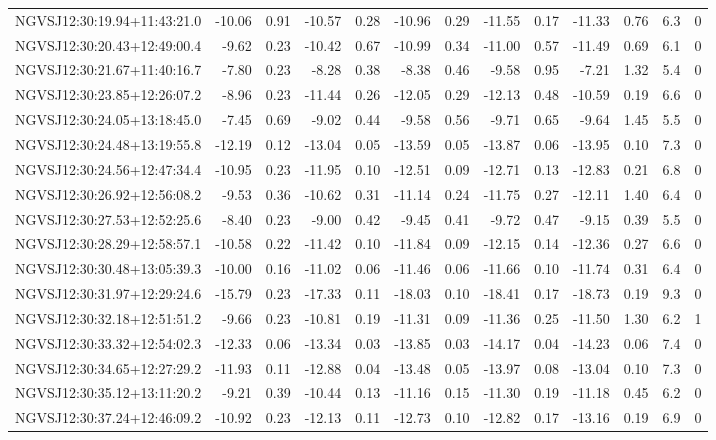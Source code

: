 \begin{tabular}{lrrrrrrrrrrcc}
NGVSJ12:30:19.94+11:43:21.0 & -10.06 & 0.91 & -10.57 & 0.28 & -10.96 & 0.29 & -11.55 & 0.17 & -11.33 & 0.76 & 6.3 & 0 \\
NGVSJ12:30:20.43+12:49:00.4 & -9.62 & 0.23 & -10.42 & 0.67 & -10.99 & 0.34 & -11.00 & 0.57 & -11.49 & 0.69 & 6.1 & 0 \\
NGVSJ12:30:21.67+11:40:16.7 & -7.80 & 0.23 & -8.28 & 0.38 & -8.38 & 0.46 & -9.58 & 0.95 & -7.21 & 1.32 & 5.4 & 0 \\
NGVSJ12:30:23.85+12:26:07.2 & -8.96 & 0.23 & -11.44 & 0.26 & -12.05 & 0.29 & -12.13 & 0.48 & -10.59 & 0.19 & 6.6 & 0 \\
NGVSJ12:30:24.05+13:18:45.0 & -7.45 & 0.69 & -9.02 & 0.44 & -9.58 & 0.56 & -9.71 & 0.65 & -9.64 & 1.45 & 5.5 & 0 \\
NGVSJ12:30:24.48+13:19:55.8 & -12.19 & 0.12 & -13.04 & 0.05 & -13.59 & 0.05 & -13.87 & 0.06 & -13.95 & 0.10 & 7.3 & 0 \\
NGVSJ12:30:24.56+12:47:34.4 & -10.95 & 0.23 & -11.95 & 0.10 & -12.51 & 0.09 & -12.71 & 0.13 & -12.83 & 0.21 & 6.8 & 0 \\
NGVSJ12:30:26.92+12:56:08.2 & -9.53 & 0.36 & -10.62 & 0.31 & -11.14 & 0.24 & -11.75 & 0.27 & -12.11 & 1.40 & 6.4 & 0 \\
NGVSJ12:30:27.53+12:52:25.6 & -8.40 & 0.23 & -9.00 & 0.42 & -9.45 & 0.41 & -9.72 & 0.47 & -9.15 & 0.39 & 5.5 & 0 \\
NGVSJ12:30:28.29+12:58:57.1 & -10.58 & 0.22 & -11.42 & 0.10 & -11.84 & 0.09 & -12.15 & 0.14 & -12.36 & 0.27 & 6.6 & 0 \\
NGVSJ12:30:30.48+13:05:39.3 & -10.00 & 0.16 & -11.02 & 0.06 & -11.46 & 0.06 & -11.66 & 0.10 & -11.74 & 0.31 & 6.4 & 0 \\
NGVSJ12:30:31.97+12:29:24.6 & -15.79 & 0.23 & -17.33 & 0.11 & -18.03 & 0.10 & -18.41 & 0.17 & -18.73 & 0.19 & 9.3 & 0 \\
NGVSJ12:30:32.18+12:51:51.2 & -9.66 & 0.23 & -10.81 & 0.19 & -11.31 & 0.09 & -11.36 & 0.25 & -11.50 & 1.30 & 6.2 & 1 \\
NGVSJ12:30:33.32+12:54:02.3 & -12.33 & 0.06 & -13.34 & 0.03 & -13.85 & 0.03 & -14.17 & 0.04 & -14.23 & 0.06 & 7.4 & 0 \\
NGVSJ12:30:34.65+12:27:29.2 & -11.93 & 0.11 & -12.88 & 0.04 & -13.48 & 0.05 & -13.97 & 0.08 & -13.04 & 0.10 & 7.3 & 0 \\
NGVSJ12:30:35.12+13:11:20.2 & -9.21 & 0.39 & -10.44 & 0.13 & -11.16 & 0.15 & -11.30 & 0.19 & -11.18 & 0.45 & 6.2 & 0 \\
NGVSJ12:30:37.24+12:46:09.2 & -10.92 & 0.23 & -12.13 & 0.11 & -12.73 & 0.10 & -12.82 & 0.17 & -13.16 & 0.19 & 6.9 & 0 \\

\end{tabular}
